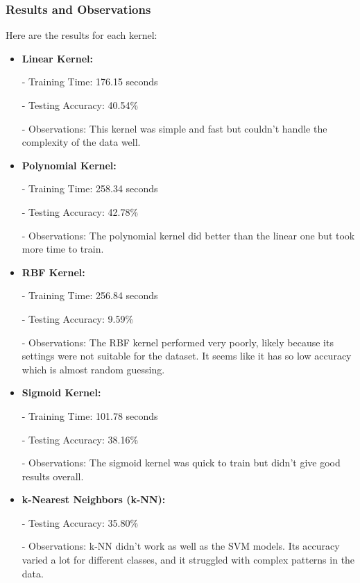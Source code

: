 \documentclass[lettersize,journal]{IEEEtran}
\begin{document}
\vspace{0.5cm}

\subsubsection{\textbf{Results and Observations}}
Here are the results for each kernel:

\begin{itemize}
    \item \textbf{Linear Kernel:}  
        
        - Training Time: 176.15 seconds 
        
        - Testing Accuracy: 40.54\%  
        
        - Observations: This kernel was simple and fast but couldn’t handle the complexity of the data well.

    \item \textbf{Polynomial Kernel:}  
        
        - Training Time: 258.34 seconds  
        
        - Testing Accuracy: 42.78\% 
        
        - Observations: The polynomial kernel did better than the linear one but took more time to train.

    \item \textbf{RBF Kernel:}  
        
        - Training Time: 256.84 seconds  
        
        - Testing Accuracy: 9.59\%  
        
        - Observations: The RBF kernel performed very poorly, likely because its settings were not suitable for the dataset. It seems like it has so low accuracy which is almost random guessing.

    \item \textbf{Sigmoid Kernel:}  
        
        - Training Time: 101.78 seconds  
        
        - Testing Accuracy: 38.16\%  
        
        - Observations: The sigmoid kernel was quick to train but didn’t give good results overall.

    \item \textbf{k-Nearest Neighbors (k-NN):}  
    
        - Testing Accuracy: 35.80\%  
    
        - Observations: k-NN didn’t work as well as the SVM models. Its accuracy varied a lot for different classes, and it struggled with complex patterns in the data.
\end{itemize}
\end{document}
